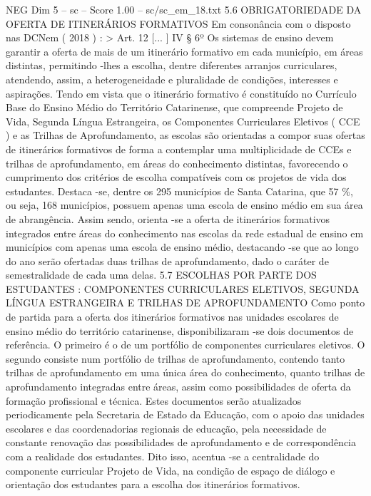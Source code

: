 \begin{textsample}{NEG Dim 5 – sc – Score 1.00 – sc/sc\_em\_18.txt}  \label{ex:f5_neg_260}
5.6 OBRIGATORIEDADE DA OFERTA DE ITINERÁRIOS FORMATIVOS Em consonância com o disposto nas DCNem ( 2018 ) : > Art. 12 [... ] IV § 6º Os sistemas de ensino devem garantir a oferta de mais de um itinerário formativo em cada município, em áreas distintas, permitindo -lhes a escolha, dentre diferentes arranjos curriculares, atendendo, assim, a heterogeneidade e pluralidade de condições, interesses e aspirações.
Tendo em vista que o itinerário formativo é constituído no Currículo Base do Ensino Médio do Território Catarinense, que compreende Projeto de Vida, Segunda Língua Estrangeira, os Componentes Curriculares Eletivos ( CCE ) e as Trilhas de Aprofundamento, as escolas são orientadas a compor suas ofertas de itinerários formativos de forma a contemplar uma multiplicidade de CCEs e trilhas de aprofundamento, em áreas do conhecimento distintas, favorecendo o cumprimento dos critérios de escolha compatíveis com os projetos de vida dos estudantes.
Destaca -se, dentre os 295 municípios de Santa Catarina, que 57 \%, ou seja, 168 municípios, possuem apenas uma escola de ensino médio em sua área de abrangência.
Assim sendo, orienta -se a oferta de itinerários formativos integrados entre áreas do conhecimento nas escolas da rede estadual de ensino em municípios com apenas uma escola de ensino médio, destacando -se que ao longo do ano serão ofertadas duas trilhas de aprofundamento, dado o caráter de semestralidade de cada uma delas. 5.7 ESCOLHAS POR PARTE DOS ESTUDANTES : COMPONENTES CURRICULARES ELETIVOS, SEGUNDA LÍNGUA ESTRANGEIRA E TRILHAS DE APROFUNDAMENTO Como ponto de partida para a oferta dos itinerários formativos nas unidades escolares de ensino médio do território catarinense, disponibilizaram -se dois documentos de referência.
O primeiro é o de um portfólio de componentes curriculares eletivos.
O segundo consiste num portfólio de trilhas de aprofundamento, contendo tanto trilhas de aprofundamento em uma única área do conhecimento, quanto trilhas de aprofundamento integradas entre áreas, assim como possibilidades de oferta da formação profissional e técnica.
Estes documentos serão atualizados periodicamente pela Secretaria de Estado da Educação, com o apoio das unidades escolares e das coordenadorias regionais de educação, pela necessidade de constante renovação das possibilidades de aprofundamento e de correspondência com a realidade dos estudantes.
Dito isso, acentua -se a centralidade do componente curricular Projeto de Vida, na condição de espaço de diálogo e orientação dos estudantes para a escolha dos itinerários formativos.

\end{textsample}
